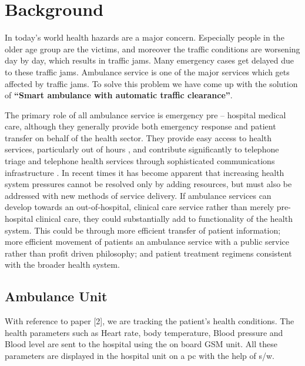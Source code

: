 \documentclass[12pt,a4paper,oneside,openright]{report}
\begin{document}
\section{Background}
In today’s world health hazards are a major concern. Especially people in the older age group are the victims, and moreover the traffic conditions are worsening day by day, which results in traffic jams. Many emergency cases get delayed due to these traffic jams.   Ambulance service is one of the major services which gets affected by traffic jams. To solve this problem we have come up with the solution of \textbf{“Smart ambulance with automatic traffic clearance”}.

The primary role of all ambulance service is emergency pre – hospital medical care, although they generally provide both emergency response and patient transfer on behalf of the health sector. They provide easy access to health services, particularly out of hours , and contribute significantly to telephone triage and telephone health services through sophisticated communications infrastructure . In recent times it has become apparent that increasing health system pressures cannot be resolved only by adding resources, but must also be addressed with new methods of service delivery. If ambulance services can develop towards an out-of-hospital, clinical care service rather than merely pre-hospital clinical care, they could substantially add to functionality of the health system. This could be through more efficient transfer of patient information; more efficient movement of patients an ambulance service with a public service rather than profit driven philosophy; and patient treatment regimens consistent with the broader health system.

\subsection{Ambulance Unit}
With reference to paper [2], we are tracking the patient’s health conditions. The health parameters such as Heart rate, body temperature, Blood pressure and Blood level are sent to the hospital using the on board GSM unit. All these parameters are displayed in the hospital unit on a pc with the help of s/w.
\end{document}
